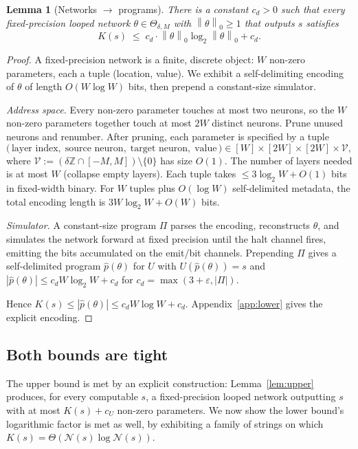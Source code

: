 \documentclass{article}
\newtheorem{lemma}[theorem]{Lemma}
\theoremstyle{definition}
\newcommand{\Z}{\mathbb{Z}}
\newcommand{\norm}[1]{\left\lVert#1\right\rVert}
\newcommand{\eps}{\varepsilon}
\newcommand{\nc}{\mathcal{N}}
\newcommand{\Param}{\Theta}
\begin{document}
\begin{lemma}[Networks $\to$ programs]\label{lem:lower}
  There is a constant $c_d > 0$ such that every fixed-precision looped network
  $\theta \in \Param_{\delta, M}$ with $\norm{\theta}_0 \ge 1$ that outputs
  $s$ satisfies
  \[
    K(s) \;\le\; c_d \cdot \norm{\theta}_0 \log_2 \norm{\theta}_0 + c_d.
  \]
\end{lemma}

\begin{proof}[Proof]
  A fixed-precision network is a finite, discrete object: $W$ non-zero parameters, each a tuple (location, value). We exhibit a self-delimiting encoding of $\theta$ of length $O(W \log W)$ bits, then prepend a constant-size simulator.

  \emph{Address space.} Every non-zero parameter touches at most two neurons, so the $W$ non-zero parameters together touch at most $2W$ distinct neurons. Prune unused neurons and renumber. After pruning, each parameter is specified by a tuple
  \[
    \bigl(\,\text{layer index},\; \text{source neuron},\; \text{target neuron},\; \text{value}\,\bigr) \in [W] \times [2W] \times [2W] \times \mathcal{V},
  \]
  where $\mathcal{V} := (\delta\Z \cap [-M, M]) \setminus \{0\}$ has size $O(1)$.
  The number of layers needed is at most $W$ (collapse empty layers). Each tuple
  takes $\le 3 \log_2 W + O(1)$ bits in fixed-width binary. For $W$ tuples plus
  $O(\log W)$ self-delimited metadata, the total encoding length is $3 W \log_2 W
    + O(W)$ bits.

  \emph{Simulator.} A constant-size program $\Pi$ parses the encoding, reconstructs $\theta$, and simulates the network forward at fixed precision until the halt channel fires, emitting the bits accumulated on the emit/bit channels. Prepending $\Pi$ gives a self-delimited program $\hat p(\theta)$ for $U$ with $U(\hat p(\theta)) = s$ and $|\hat p(\theta)| \le c_d W \log_2 W + c_d$ for $c_d = \max(3 + \eps, |\Pi|)$.

  Hence $K(s) \le |\hat p(\theta)| \le c_d W \log W + c_d$.
  Appendix~\ref{app:lower} gives the explicit encoding.
\end{proof}

\subsection{Both bounds are tight}\label{sec:main:tightness}

The upper bound is met by an explicit construction: Lemma~\ref{lem:upper}
produces, for every computable $s$, a fixed-precision looped network outputting
$s$ with at most $K(s) + c_U$ non-zero parameters. We now show the lower
bound's logarithmic factor is met as well, by exhibiting a family of strings on
which $K(s) = \Theta(\nc(s) \log \nc(s))$.
\end{document}
